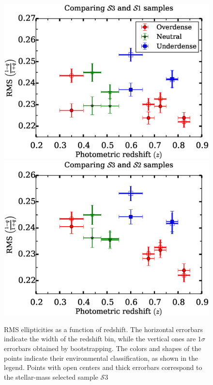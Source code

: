 \documentclass[twocolumn,useAMS,usenatbib]{mn2e}
\newcommand{\s}{\ensuremath{\mathcal{S}}}
\begin{document}
\begin{figure}
 \centering
 \includegraphics[width=1.0\columnwidth]{rms_ellip1_noevolution.eps} \\
 \includegraphics[width=1.0\columnwidth]{rms_ellip1_Bbandevolution.eps} \\
 \caption{RMS ellipticities as a function of redshift. The horizontal errorbars indicate
          the width of the redshift bin, while the vertical ones
          are $1\sigma$ errorbars obtained by
          bootstrapping. The colors and shapes of the points indicate their
          environmental classification, as shown in the legend. Points with open centers and thick errorbars correspond to the stellar-mass selected sample \s$3$
}
\end{figure}
\end{document}
